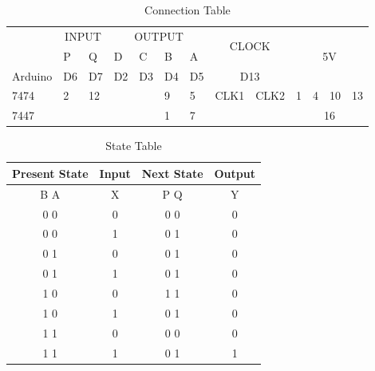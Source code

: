 \documentclass[journal,12pt,twocolumn]{IEEEtran}
\begin{document}
\centering
\begin{table}[h!]
\large
\begin{tabular}{|l|ll|llll|cl|clll|}
\hline
\multirow{2}{*}{} & \multicolumn{2}{c|}{INPUT}   & \multicolumn{4}{c|}{OUTPUT}                                                      & \multicolumn{2}{c|}{\multirow{2}{*}{CLOCK}} & \multicolumn{4}{c|}{\multirow{3}{*}{5V}}                                       \\ \cline{2-7}
                  & \multicolumn{1}{l|}{P}  & Q  & \multicolumn{1}{l|}{D}  & \multicolumn{1}{l|}{C}  & \multicolumn{1}{l|}{B}  & A  & \multicolumn{2}{c|}{}                       & \multicolumn{4}{c|}{}                                                          \\ \cline{1-9}
Arduino           & \multicolumn{1}{l|}{D6} & D7 & \multicolumn{1}{l|}{D2} & \multicolumn{1}{l|}{D3} & \multicolumn{1}{l|}{D4} & D5 & \multicolumn{2}{c|}{D13}                    & \multicolumn{4}{c|}{}                                                          \\ \hline
7474              & \multicolumn{1}{l|}{2}  & 12 & \multicolumn{1}{l|}{}   & \multicolumn{1}{l|}{}   & \multicolumn{1}{l|}{9}  & 5  & \multicolumn{1}{l|}{CLK1}       & CLK2      & \multicolumn{1}{l|}{1} & \multicolumn{1}{l|}{4} & \multicolumn{1}{l|}{10} & 13 \\ \hline
7447              & \multicolumn{1}{l|}{}   &    & \multicolumn{1}{l|}{}   & \multicolumn{1}{l|}{}   & \multicolumn{1}{l|}{1}  & 7  & \multicolumn{1}{l|}{}           &           & \multicolumn{4}{c|}{16}                                                        \\ \hline
\end{tabular}
\centering
\caption{Connection Table}
\label{table:2}
\end{table}

\begin{table}[h!]
\begin{tabular}{|c|c|c|c|}
\hline
Present State & Input & Next State & Output\\
\hline
B A & X & P Q & Y\\
\hline
0 0 & 0 & 0 0 & 0\\
0 0 & 1 & 0 1 & 0\\
0 1 & 0 & 0 1 & 0\\
0 1 & 1 & 0 1 & 0\\
1 0 & 0 & 1 1 & 0\\
1 0 & 1 & 0 1 & 0\\
1 1 & 0 & 0 0 & 0\\
1 1 & 1 & 0 1 & 1\\
\hline
\end{tabular}
\centering
\caption{State Table}
\label{table:2}
\end{table}
\end{document}
